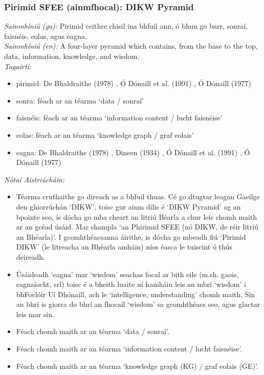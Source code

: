\subsubsection*{Pirimid SFEE (ainmfhocal): DIKW Pyramid}
 \noindent \textit{Sainmhíniú (ga):} Pirimid ceithre chisil ina bhfuil ann, ó bhun go barr, sonraí, faisnéis, eolas, agus eagna.
\\
 \noindent \textit{Sainmhíniú (en):} A four-layer pyramid which contains, from the base to the top, data, information, knowledge, and wisdom.
\\
 \noindent \textit{Tagairtí:}
\begin{itemize}
	\item pirimid: De Bhaldraithe (1978) \cite{de-bhaldraithe}, Ó Dónaill et al. (1991) \cite{focloir-beag}, Ó Dónaill (1977) \cite{odonaill}
	\item sonra: féach ar an téarma `data / sonraí'
	\item faisnéis: féach ar an téarma `information content / lucht faisnéise'
	\item eolas: féach ar an téarma `knowledge graph / graf eolais'
	\item eagna: De Bhaldraithe (1978) \cite{de-bhaldraithe}, Dineen (1934) \cite{dineen}, Ó Dónaill et al. (1991) \cite{focloir-beag}, Ó Dónaill (1977) \cite{odonaill}
\end{itemize}

 \noindent \textit{Nótaí Aistriúcháin:}
\begin{itemize}
	\item Téarma cruthaithe go díreach as a bhfuil thuas. Cé go dtugtar leagan Gaeilge den ghiorrúchán `DIKW', toisc gur ainm dílis é `DIKW Pyramid' ag an bpointe seo, is dócha go mba cheart an litriú Béarla a chur leis chomh maith ar an gcéad úsáid. Mar shampla `an Phirimid SFEE (nó DIKW, de réir litriú an Bhéarla)'. I gcomhthéacsanna áirithe, is dócha go mbeadh fiú `Pirimid DIKW' (le litreacha an Bhéarla amháin) níos éasca le tuiscint ó thús deireadh.
	\item Úsáideadh `eagna' mar `wisdom' seachas focal ar bith eile (m.sh. gaois, eagnaíocht, srl) toisc é a bheith luaite ní hamháin leis an mbrí `wisdom' i bhFoclóir Uí Dhónaill, ach le `intelligence, understanding' chomh maith. Sin an bhrí is giorra do bhrí an fhocail `wisdom' sa gcomhthéacs seo, agus glactar leis mar sin.
	\item Féach chomh maith ar an téarma `data / sonraí'.
	\item Féach chomh maith ar an téarma `information content / lucht faisnéise'.
	\item Féach chomh maith ar an téarma `knowledge graph (KG) / graf eolais (GE)'.
\end{itemize}


